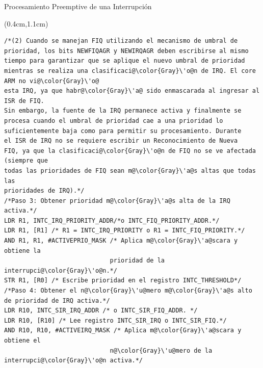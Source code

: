 \documentclass[usenames,table,xcolor={x11names},aspectratio=169]{beamer}
\begin{document}
\begin{frame}[t,fragile]{Procesamiento Preemptive de una Interrupción}
 \begin{textblock*}{\textwidth}(0.4cm,1.1cm)
  \begin{lstlisting}[basicstyle=\scriptsize,escapechar=\@,numbers=none, frame=single, xleftmargin=20pt, xrightmargin=0pt,]
/*(2) Cuando se manejan FIQ utilizando el mecanismo de umbral de 
prioridad, los bits NEWFIQAGR y NEWIRQAGR deben escribirse al mismo 
tiempo para garantizar que se aplique el nuevo umbral de prioridad 
mientras se realiza una clasificaci@\color{Gray}\'o@n de IRQ. El core ARM no vi@\color{Gray}\'o@
esta IRQ, ya que habr@\color{Gray}\'a@ sido enmascarada al ingresar al ISR de FIQ. 
Sin embargo, la fuente de la IRQ permanece activa y finalmente se 
procesa cuando el umbral de prioridad cae a una prioridad lo 
suficientemente baja como para permitir su procesamiento. Durante 
el ISR de IRQ no se requiere escribir un Reconocimiento de Nueva 
FIQ, ya que la clasificaci@\color{Gray}\'o@n de FIQ no se ve afectada (siempre que 
todas las prioridades de FIQ sean m@\color{Gray}\'a@s altas que todas las 
prioridades de IRQ).*/
/*Paso 3: Obtener prioridad m@\color{Gray}\'a@s alta de la IRQ activa.*/
LDR R1, INTC_IRQ_PRIORITY_ADDR/*o INTC_FIQ_PRIORITY_ADDR.*/
LDR R1, [R1] /* R1 = INTC_IRQ_PRIORITY o R1 = INTC_FIQ_PRIORITY.*/
AND R1, R1, #ACTIVEPRIO_MASK /* Aplica m@\color{Gray}\'a@scara y obtiene la 
                             prioridad de la interrupci@\color{Gray}\'o@n.*/
STR R1, [R0] /* Escribe prioridad en el registro INTC_THRESHOLD*/
/*Paso 4: Obtener el n@\color{Gray}\'u@mero m@\color{Gray}\'a@s alto de prioridad de IRQ activa.*/
LDR R10, INTC_SIR_IRQ_ADDR /* o INTC_SIR_FIQ_ADDR. */
LDR R10, [R10] /* Lee registro INTC_SIR_IRQ o INTC_SIR_FIQ.*/
AND R10, R10, #ACTIVEIRQ_MASK /* Aplica m@\color{Gray}\'a@scara y obtiene el 
                             n@\color{Gray}\'u@mero de la interrupci@\color{Gray}\'o@n activa.*/
  \end{lstlisting}
 \end{textblock*}
\end{frame}
\end{document}
